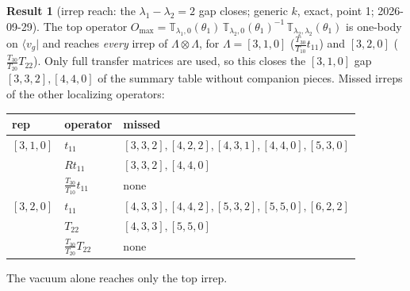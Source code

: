 \documentclass[11pt]{article}
\theoremstyle{definition}
\newtheorem{result}{Result}
\theoremstyle{remark}
\begin{document}
\begin{result}[{irrep reach: the $\lambda_1-\lambda_2=2$ gap closes; generic $k$, exact, point 1; 2026-09-29}]
The top operator $O_{\max}=\mathbb T_{\lambda_1,0}(\theta_1)\,\mathbb T_{\lambda_2,0}(\theta_1)^{-1}\,\mathbb T_{\lambda_2,\lambda_2}(\theta_1)$ is one-body on $\langle v_g|$ and reaches \emph{every} irrep of $\Lambda\otimes\Lambda$, for $\Lambda=[3,1,0]$ ($\tfrac{T_{30}}{T_{10}}t_{11}$) and $[3,2,0]$ ($\tfrac{T_{30}}{T_{20}}T_{22}$). Only full transfer matrices are used, so this closes the $[3,1,0]$ gap $[3,3,2],[4,4,0]$ of the summary table without companion pieces. Missed irreps of the other localizing operators:
\begin{center}
\begin{tabular}{lll}\toprule
rep & operator & missed\\\midrule
$[3,1,0]$ & $t_{11}$ & $[3,3,2],[4,2,2],[4,3,1],[4,4,0],[5,3,0]$\\
 & $Rt_{11}$ & $[3,3,2],[4,4,0]$\\
 & $\tfrac{T_{30}}{T_{10}}t_{11}$ & none\\
$[3,2,0]$ & $t_{11}$ & $[4,3,3],[4,4,2],[5,3,2],[5,5,0],[6,2,2]$\\
 & $T_{22}$ & $[4,3,3],[5,5,0]$\\
 & $\tfrac{T_{30}}{T_{20}}T_{22}$ & none\\\bottomrule
\end{tabular}
\end{center}
The vacuum alone reaches only the top irrep.
\end{result}
\end{document}
